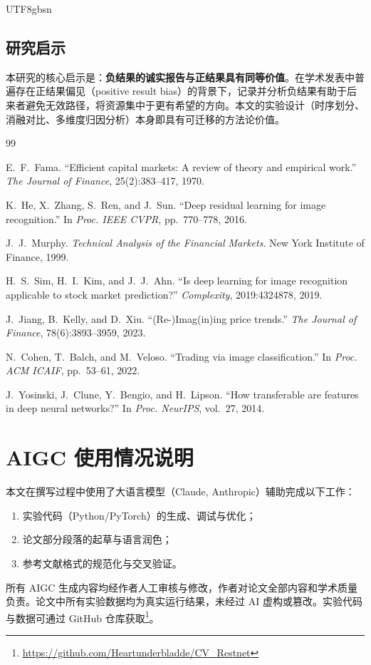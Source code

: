 \documentclass[12pt,a4paper]{article}
\begin{document}
\begin{CJK}{UTF8}{gbsn}
\subsection{研究启示}

本研究的核心启示是：\textbf{负结果的诚实报告与正结果具有同等价值}。在学术发表中普遍存在正结果偏见（positive result bias）的背景下，记录并分析负结果有助于后来者避免无效路径，将资源集中于更有希望的方向。本文的实验设计（时序划分、消融对比、多维度归因分析）本身即具有可迁移的方法论价值。

\begin{thebibliography}{99}

E.~F.~Fama.
``Efficient capital markets: A review of theory and empirical work.''
\textit{The Journal of Finance}, 25(2):383--417, 1970.

K.~He, X.~Zhang, S.~Ren, and J.~Sun.
``Deep residual learning for image recognition.''
In \textit{Proc. IEEE CVPR}, pp.~770--778, 2016.

J.~J.~Murphy.
\textit{Technical Analysis of the Financial Markets}.
New York Institute of Finance, 1999.

H.~S.~Sim, H.~I.~Kim, and J.~J.~Ahn.
``Is deep learning for image recognition applicable to stock market prediction?''
\textit{Complexity}, 2019:4324878, 2019.

J.~Jiang, B.~Kelly, and D.~Xiu.
``(Re-)Imag(in)ing price trends.''
\textit{The Journal of Finance}, 78(6):3893--3959, 2023.

N.~Cohen, T.~Balch, and M.~Veloso.
``Trading via image classification.''
In \textit{Proc. ACM ICAIF}, pp.~53--61, 2022.

J.~Yosinski, J.~Clune, Y.~Bengio, and H.~Lipson.
``How transferable are features in deep neural networks?''
In \textit{Proc. NeurIPS}, vol.~27, 2014.

\end{thebibliography}

\section*{AIGC 使用情况说明}

本文在撰写过程中使用了大语言模型（Claude, Anthropic）辅助完成以下工作：
\begin{enumerate}[noitemsep]
    \item 实验代码（Python/PyTorch）的生成、调试与优化；
    \item 论文部分段落的起草与语言润色；
    \item 参考文献格式的规范化与交叉验证。
\end{enumerate}

所有 AIGC 生成内容均经作者人工审核与修改，作者对论文全部内容和学术质量负责。论文中所有实验数据均为真实运行结果，未经过 AI 虚构或篡改。实验代码与数据可通过 GitHub 仓库获取\footnote{\url{https://github.com/Heartunderbladde/CV\_Restnet}}。

\end{CJK}
\end{document}
